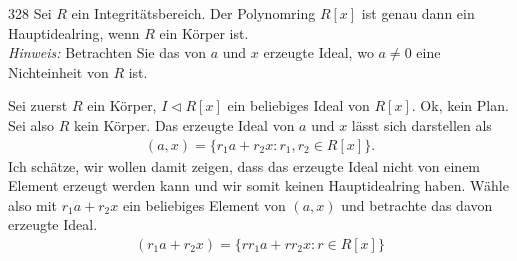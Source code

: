 \begin{algebraUE}{328}
Sei $R$ ein Integritätsbereich. Der Polynomring $R[x]$ ist genau dann ein
Hauptidealring, wenn $R$ ein Körper ist. \\
\textit{Hinweis:} Betrachten Sie das von $a$ und $x$ erzeugte Ideal, wo $a \neq 0$
eine Nichteinheit von $R$ ist.
\end{algebraUE}
\begin{solution}
Sei zuerst $R$ ein Körper, $I \vartriangleleft R[x]$ ein beliebiges Ideal von $R[x]$.
Ok, kein Plan. \\
Sei also $R$ kein Körper. Das erzeugte Ideal von $a$ und $x$ lässt sich darstellen als
\begin{align*}
  (a,x) = \{r_1a + r_2x: r_1,r_2 \in R[x]\}.
\end{align*}
Ich schätze, wir wollen damit zeigen, dass das erzeugte Ideal nicht von einem
Element erzeugt werden kann und wir somit keinen Hauptidealring haben.
Wähle also mit $r_1a + r_2x$ ein beliebiges Element von $(a,x)$
und betrachte das davon erzeugte Ideal.
\begin{align*}
  (r_1a + r_2x) = \{rr_1a + rr_2x: r \in R[x]\}
\end{align*}
\end{solution}

